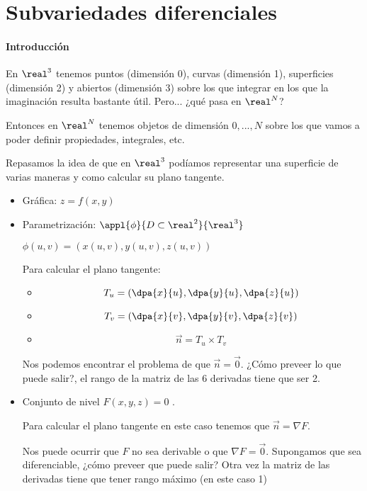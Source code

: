\section{Subvariedades diferenciales}
  
  \paragraph{Introducción}
  
  En $\real^3$ tenemos puntos (dimensión 0), curvas (dimensión 1), superficies (dimensión 2) y abiertos (dimensión 3) sobre los que integrar en los que la imaginación resulta bastante útil. Pero... ¿qué pasa en $\real^N$? 
  
  Entonces en $\real^N$ tenemos objetos de dimensión $0,...,N$ sobre los que vamos a poder definir propiedades, integrales, etc.
  
  Repasamos la idea de que en $\real^3$ podíamos representar una superficie de varias maneras y como calcular su plano tangente.
  \begin{itemize}
   \item Gráfica: $z=f(x,y)$
   \item Parametrización: $\appl{\phi}{D\subset\real^2}{\real^3}$
     
     $\phi(u,v) = (x(u,v),y(u,v),z(u,v))$
     
     Para calcular el plano tangente:
     
     \begin{itemize}
      \item \[T_u = \left( \dpa{x}{u},\dpa{y}{u},\dpa{z}{u}\right)\]
      \item\[T_v = \left( \dpa{x}{v},\dpa{y}{v},\dpa{z}{v}\right)\]
      \item\[ \overrightarrow{n} = T_u\times T_v\]
     \end{itemize}

     Nos podemos encontrar el problema de que $\overrightarrow{n} = \overrightarrow{0}$. ¿Cómo preveer lo que puede salir?, el rango de la matriz de las 6 derivadas tiene que ser 2.
     
   \item Conjunto de nivel $F(x,y,z) = 0$ .
   
   Para calcular el plano tangente en este caso tenemos que $\overrightarrow{n} = \nabla F$. 
   
   Nos puede ocurrir que $F$ no sea derivable o que $\nabla F = \overrightarrow{0}$. Supongamos que sea diferenciable, ¿cómo preveer que puede salir? Otra vez la matriz de las derivadas tiene que tener rango máximo (en este caso 1)
  \end{itemize}
  
